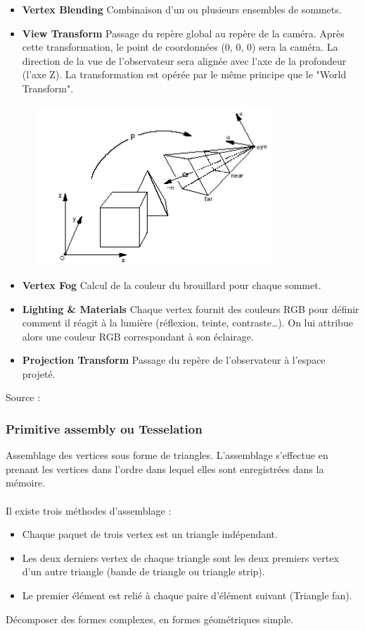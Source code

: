\begin{itemize}
	\item{\textbf{Vertex Blending}}
Combinaison d’un ou plusieurs ensembles de sommets.
\\
	\item{\textbf{View Transform}}
Passage du repère global au repère de la caméra. Après cette transformation, le point de coordonnées (0, 0, 0) sera la caméra. La direction de la vue de l’observateur sera alignée avec l'axe de la profondeur (l'axe Z). La transformation est opérée par le même principe que le "World Transform".
\\
\begin{center}
\includegraphics[width=10cm,height=60mm]{pipeline/images/repereCamera.png}
\end{center}

	\item{\textbf{Vertex Fog}}
Calcul de la couleur du brouillard pour chaque sommet.
\\
	\item{\textbf{Lighting \& Materials}}
Chaque vertex fournit des couleurs RGB pour définir comment il réagit à la lumière (réflexion, teinte, contraste…). On lui attribue alors une couleur RGB correspondant à son éclairage.
\\
	\item{\textbf{Projection Transform}}
Passage du repère de l'observateur à l'espace projeté.
\\
\end{itemize}

Source : \cite{pipeline3}

\subsubsection{Primitive assembly ou Tesselation}
Assemblage des vertices sous forme de triangles. L’assemblage s’effectue en prenant les vertices dans l’ordre dans lequel elles sont enregistrées dans la mémoire.
\\\\
Il existe trois méthodes d’assemblage :
\begin{itemize}
	\item Chaque paquet de trois vertex est un triangle indépendant.
	\item Les deux derniers vertex de chaque triangle sont les deux premiers vertex d’un autre triangle (bande de triangle ou triangle strip).
	\item Le premier élément est relié à chaque paire d’élément suivant (Triangle fan).
	\end{itemize}
Décomposer des formes complexes, en formes géométriques simple.

